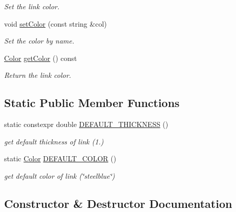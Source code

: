 \begin{DoxyCompactItemize}
\begin{DoxyCompactList}\small\item\em Set the link color. \end{DoxyCompactList}\item 
void \hyperlink{classbridges_1_1datastructure_1_1_link_visualizer_af570ade2d50a8789db3b06b79e5dc589}{set\+Color} (const string \&col)
\begin{DoxyCompactList}\small\item\em Set the color by name. \end{DoxyCompactList}\item 
\hyperlink{classbridges_1_1datastructure_1_1_color}{Color} \hyperlink{classbridges_1_1datastructure_1_1_link_visualizer_aeeecf856414fc894b9764e66aef614e1}{get\+Color} () const
\begin{DoxyCompactList}\small\item\em Return the link color. \end{DoxyCompactList}\end{DoxyCompactItemize}
\subsection*{Static Public Member Functions}
\begin{DoxyCompactItemize}
\item 
static constexpr double \hyperlink{classbridges_1_1datastructure_1_1_link_visualizer_a3b23cb9f5ab2dd564fcc4d974e3753f8}{D\+E\+F\+A\+U\+L\+T\+\_\+\+T\+H\+I\+C\+K\+N\+E\+SS} ()
\begin{DoxyCompactList}\small\item\em get default thickness of link (1.) \end{DoxyCompactList}\item 
static \hyperlink{classbridges_1_1datastructure_1_1_color}{Color} \hyperlink{classbridges_1_1datastructure_1_1_link_visualizer_aa42e1a41ab0332c2e50e1a21068b2533}{D\+E\+F\+A\+U\+L\+T\+\_\+\+C\+O\+L\+OR} ()
\begin{DoxyCompactList}\small\item\em get default color of link (\char`\"{}steelblue\char`\"{}) \end{DoxyCompactList}\end{DoxyCompactItemize}


\subsection{Constructor \& Destructor Documentation}
\mbox{\label{classbridges_1_1datastructure_1_1_link_visualizer_ae910a1d6f13a3807b025c2c94231d7c8}} 
